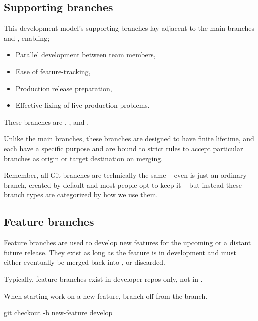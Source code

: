 \subsection{Supporting branches}

This development model's supporting branches lay adjacent to the main branches  and , enabling;

\begin{itemize}
	\item Parallel development between team members,
	\item Ease of feature-tracking,
	\item Production release preparation,
	\item Effective fixing of live production problems.
\end{itemize}

\noindent These branches are , , and . \newline

Unlike the main branches, these branches are designed to have finite lifetime, and each have a specific purpose and are bound to strict rules to accept particular branches as origin or target destination on merging.

Remember, all Git branches are technically the same – even  is just an ordinary branch, created by default and most people opt to keep it – but instead these branch types are categorized by how we use them.



\subsection{Feature branches}

Feature branches are used to develop new features for the upcoming or a distant future release. They exist as long as the feature is in development and must either eventually be merged back into , or discarded. \newline

\noindent Typically, feature branches exist in developer repos only, not in . \newline

\noindent When starting work on a new feature, branch off from the  branch.

\begin{git-bash}
    git checkout -b new-feature develop
\end{git-bash}

